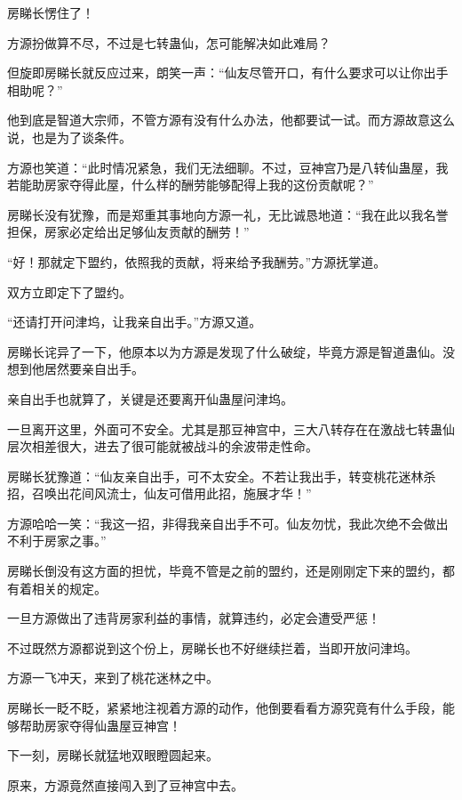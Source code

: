 
\begin{this_body}

房睇长愣住了！

方源扮做算不尽，不过是七转蛊仙，怎可能解决如此难局？

但旋即房睇长就反应过来，朗笑一声：“仙友尽管开口，有什么要求可以让你出手相助呢？”

他到底是智道大宗师，不管方源有没有什么办法，他都要试一试。而方源故意这么说，也是为了谈条件。

方源也笑道：“此时情况紧急，我们无法细聊。不过，豆神宫乃是八转仙蛊屋，我若能助房家夺得此屋，什么样的酬劳能够配得上我的这份贡献呢？”

房睇长没有犹豫，而是郑重其事地向方源一礼，无比诚恳地道：“我在此以我名誉担保，房家必定给出足够仙友贡献的酬劳！”

“好！那就定下盟约，依照我的贡献，将来给予我酬劳。”方源抚掌道。

双方立即定下了盟约。

“还请打开问津坞，让我亲自出手。”方源又道。

房睇长诧异了一下，他原本以为方源是发现了什么破绽，毕竟方源是智道蛊仙。没想到他居然要亲自出手。

亲自出手也就算了，关键是还要离开仙蛊屋问津坞。

一旦离开这里，外面可不安全。尤其是那豆神宫中，三大八转存在在激战七转蛊仙层次相差很大，进去了很可能就被战斗的余波带走性命。

房睇长犹豫道：“仙友亲自出手，可不太安全。不若让我出手，转变桃花迷林杀招，召唤出花间风流士，仙友可借用此招，施展才华！”

方源哈哈一笑：“我这一招，非得我亲自出手不可。仙友勿忧，我此次绝不会做出不利于房家之事。”

房睇长倒没有这方面的担忧，毕竟不管是之前的盟约，还是刚刚定下来的盟约，都有着相关的规定。

一旦方源做出了违背房家利益的事情，就算违约，必定会遭受严惩！

不过既然方源都说到这个份上，房睇长也不好继续拦着，当即开放问津坞。

方源一飞冲天，来到了桃花迷林之中。

房睇长一眨不眨，紧紧地注视着方源的动作，他倒要看看方源究竟有什么手段，能够帮助房家夺得仙蛊屋豆神宫！

下一刻，房睇长就猛地双眼瞪圆起来。

原来，方源竟然直接闯入到了豆神宫中去。


\end{this_body}
